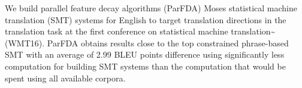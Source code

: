 We build parallel feature decay algorithms (ParFDA) Moses statistical machine translation (SMT) systems for English to target translation directions in the translation task at the first conference on statistical machine translation{\textasciitilde}\cite{WMT2016} (WMT16). ParFDA obtains results close to the top constrained phrase-based SMT with an average of 2.99 BLEU points difference using significantly less computation for building SMT systems than the computation that would be spent using all available corpora.

